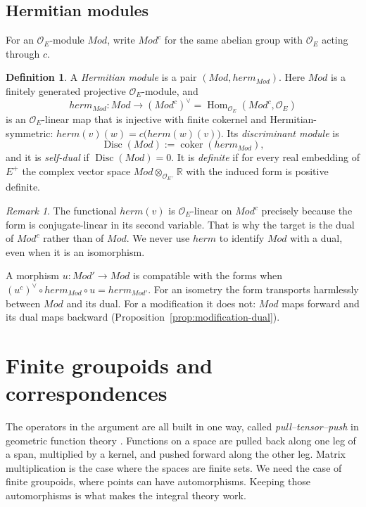 \documentclass[11pt]{amsart}
\theoremstyle{definition}
\newtheorem{definition}[theorem]{Definition}
\theoremstyle{remark}
\newtheorem{remark}[theorem]{Remark}
\newcommand{\OEring}{\mathcal{O}_E}
\newcommand{\OEp}{\mathcal{O}_{E^+}}
\newcommand{\Md}{\mathit{Mod}}
\newcommand{\herm}{\mathit{herm}}
\DeclareMathOperator{\Hom}{Hom}
\DeclareMathOperator{\Disc}{Disc}
\DeclareMathOperator{\coker}{coker}
\newcommand{\R}{\mathbb{R}}
\newcommand{\dual}{^{\vee}}
\newcommand{\conj}{^{c}}
\begin{document}
\subsection{Hermitian modules}

For an $\OEring$-module $\Md$, write $\Md\conj$ for the same abelian group with $\OEring$ acting through $c$.

\begin{definition}\label{def:herm-module}
A \emph{Hermitian module} is a pair $(\Md,\herm_{\Md})$. Here $\Md$ is a finitely generated projective $\OEring$-module, and
\[
\herm_{\Md}\colon \Md\longrightarrow (\Md\conj)\dual=\Hom_{\OEring}(\Md\conj,\OEring)
\]
is an $\OEring$-linear map that is injective with finite cokernel and Hermitian-symmetric: $\herm(v)(w)=c\bigl(\herm(w)(v)\bigr)$. Its \emph{discriminant module} is
\[
\Disc(\Md):=\coker(\herm_{\Md}),
\]
and it is \emph{self-dual} if $\Disc(\Md)=0$. It is \emph{definite} if for every real embedding of $E^+$ the complex vector space $\Md\otimes_{\OEp}\R$ with the induced form is positive definite.
\end{definition}

\begin{remark}
The functional $\herm(v)$ is $\OEring$-linear on $\Md\conj$ precisely because the form is conjugate-linear in its second variable. That is why the target is the dual of $\Md\conj$ rather than of $\Md$. We never use $\herm$ to identify $\Md$ with a dual, even when it is an isomorphism.

A morphism $u\colon\Md'\to\Md$ is compatible with the forms when $(u\conj)\dual\circ\herm_{\Md}\circ u=\herm_{\Md'}$. For an isometry the form transports harmlessly between $\Md$ and its dual. For a modification it does not: $\Md$ maps forward and its dual maps backward (Proposition~\ref{prop:modification-dual}).
\end{remark}

\section{Finite groupoids and correspondences}\label{sec:groupoids}

The operators in the argument are all built in one way, called \emph{pull--tensor--push} in geometric function theory \cite{nLab-GFT,BaezHoffnungWalker}. Functions on a space are pulled back along one leg of a span, multiplied by a kernel, and pushed forward along the other leg. Matrix multiplication is the case where the spaces are finite sets. We need the case of finite groupoids, where points can have automorphisms. Keeping those automorphisms is what makes the integral theory work.
\end{document}
